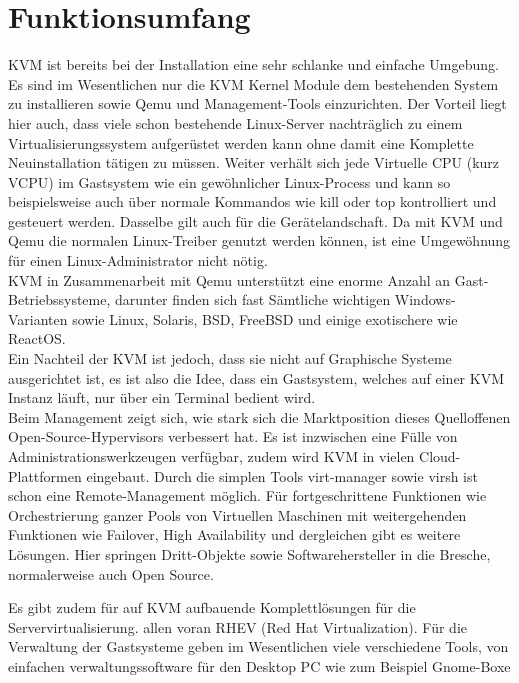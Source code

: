\documentclass[14pt]{extreport}
\begin{document}
\section{Funktionsumfang}
KVM ist bereits bei der Installation eine sehr schlanke und einfache Umgebung. 
Es sind im Wesentlichen nur die KVM Kernel Module dem bestehenden System zu installieren sowie Qemu und Management-Tools einzurichten. Der Vorteil liegt hier auch, dass viele schon bestehende Linux-Server nachträglich zu einem Virtualisierungssystem aufgerüstet werden kann ohne damit eine Komplette Neuinstallation tätigen zu müssen.
Weiter verhält sich jede  Virtuelle CPU (kurz VCPU) im Gastsystem wie ein gewöhnlicher Linux-Process und kann so beispielsweise auch über normale Kommandos wie kill oder top kontrolliert und gesteuert werden. Dasselbe gilt auch für die Gerätelandschaft. Da mit KVM und Qemu die normalen Linux-Treiber genutzt werden können, ist eine Umgewöhnung für einen Linux-Administrator nicht nötig.\\

KVM in Zusammenarbeit mit Qemu unterstützt eine enorme Anzahl an Gast-Betriebssysteme, darunter finden sich fast Sämtliche wichtigen Windows-Varianten sowie Linux, Solaris, BSD, FreeBSD und einige exotischere wie ReactOS. \\

Ein Nachteil der KVM ist jedoch, dass sie nicht auf Graphische Systeme ausgerichtet ist, es ist also die Idee, dass ein Gastsystem, welches auf einer KVM Instanz läuft, nur über ein Terminal bedient wird.\\
Beim Management zeigt sich, wie stark sich die Marktposition dieses Quelloffenen Open-Source-Hypervisors verbessert hat. Es ist inzwischen eine Fülle von Administrationswerkzeugen verfügbar, zudem wird KVM in vielen Cloud-Plattformen eingebaut.
Durch die simplen Tools virt-manager sowie virsh ist schon eine Remote-Management möglich. Für fortgeschrittene Funktionen wie Orchestrierung ganzer Pools von Virtuellen Maschinen mit weitergehenden Funktionen wie Failover, High Availability und dergleichen gibt es weitere Lösungen. Hier springen Dritt-Objekte sowie Softwarehersteller in die Bresche, normalerweise auch Open Source. 

Es gibt zudem für auf KVM aufbauende Komplettlösungen für die Servervirtualisierung. allen voran RHEV (Red Hat Virtualization).
Für die Verwaltung der Gastsysteme geben im Wesentlichen viele verschiedene Tools, von einfachen verwaltungssoftware für den Desktop PC wie zum Beispiel Gnome-Boxe \cite{website:esxyVergleich}
\end{document}
